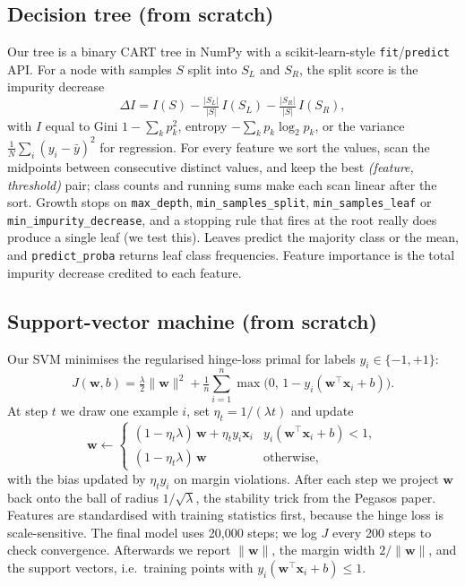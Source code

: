 \documentclass[10pt,twocolumn,a4paper]{article}
\begin{document}
\subsection{Decision tree (from scratch)}
Our tree is a binary CART tree in NumPy with a scikit-learn-style
\texttt{fit}/\texttt{predict} API. For a node with samples $S$ split into
$S_L$ and $S_R$, the split score is the impurity decrease
\begin{equation}
  \Delta I = I(S) - \tfrac{|S_L|}{|S|}\,I(S_L) - \tfrac{|S_R|}{|S|}\,I(S_R),
\end{equation}
with $I$ equal to Gini $1-\sum_k p_k^2$, entropy $-\sum_k p_k\log_2 p_k$, or
the variance $\tfrac{1}{N}\sum_i (y_i-\bar y)^2$ for regression. For every
feature we sort the values, scan the midpoints between consecutive distinct
values, and keep the best \emph{(feature, threshold)} pair; class counts and
running sums make each scan linear after the sort. Growth stops on
\texttt{max\_depth}, \texttt{min\_samples\_split}, \texttt{min\_samples\_leaf} or
\texttt{min\_impurity\_decrease}, and a stopping rule that fires at the root
really does produce a single leaf (we test this). Leaves predict the majority
class or the mean, and \texttt{predict\_proba} returns leaf class frequencies.
Feature importance is the total impurity decrease credited to each feature.

\subsection{Support-vector machine (from scratch)}
Our SVM minimises the regularised hinge-loss primal for labels
$y_i\in\{-1,+1\}$:
\begin{equation}
  J(\mathbf{w},b)=\tfrac{\lambda}{2}\lVert\mathbf{w}\rVert^{2}
  +\tfrac{1}{n}\sum_{i=1}^{n}\max\!\big(0,\,1-y_i(\mathbf{w}^{\top}\mathbf{x}_i+b)\big).
\end{equation}
At step $t$ we draw one example $i$, set $\eta_t=1/(\lambda t)$ and update
\begin{equation}
  \mathbf{w}\leftarrow
  \begin{cases}
    (1-\eta_t\lambda)\,\mathbf{w}+\eta_t y_i\mathbf{x}_i & y_i(\mathbf{w}^{\top}\mathbf{x}_i+b)<1,\\
    (1-\eta_t\lambda)\,\mathbf{w} & \text{otherwise,}
  \end{cases}
\end{equation}
with the bias updated by $\eta_t y_i$ on margin violations. After each step
we project $\mathbf{w}$ back onto the ball of radius $1/\sqrt{\lambda}$, the stability
trick from the Pegasos paper. Features are standardised with training
statistics first, because the hinge loss is scale-sensitive. The final model
uses 20{,}000 steps; we log $J$ every 200 steps to check convergence.
Afterwards we report $\lVert\mathbf{w}\rVert$, the margin width
$2/\lVert\mathbf{w}\rVert$, and the support vectors, i.e.\ training points with
$y_i(\mathbf{w}^{\top}\mathbf{x}_i+b)\le 1$.
\end{document}
